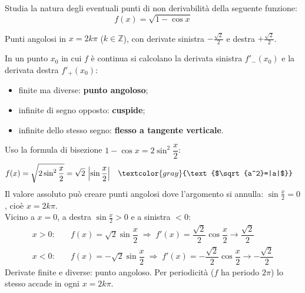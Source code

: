 
\begin{question}[ID=1.2, subtitle={Punti di non derivabilità di $f(x)=\sqrt{1-\cos x}$}, tags={non derivabilità, studio di funzione}, difficulty=media]
Studia la natura degli eventuali punti di non derivabilità della seguente funzione:
\begin{equation*}
    f(x) = \sqrt{1-\cos x}
\end{equation*}
\begin{solution}
Punti angolosi in $x=2k\pi$ ($k\in\mathbb{Z}$), con derivate sinistra $-\tfrac{\sqrt2}{2}$ e destra $+\tfrac{\sqrt2}{2}$.
\end{solution}
\begin{explanation}
In un punto $x_0$ in cui $f$ è continua si calcolano la derivata sinistra $f'_-(x_0)$ e la derivata destra $f'_+(x_0)$:
\begin{itemize}
    \item finite ma diverse: \textbf{punto angoloso};
    \item infinite di segno opposto: \textbf{cuspide};
    \item infinite dello stesso segno: \textbf{flesso a tangente verticale}.
\end{itemize}
Uso la formula di bisezione $1-\cos x=2\sin^2\dfrac x2$:
\[\begin{aligned}
f(x) &= \sqrt{2\sin^2\dfrac x2}=\sqrt2\,\left|\sin\dfrac x2\right| && \textcolor{gray}{\text{$\sqrt{a^2}=|a|$}}
\end{aligned}\]
Il valore assoluto può creare punti angolosi dove l'argomento si annulla: $\sin\tfrac x2=0$, cioè $x=2k\pi$. \\
Vicino a $x=0$, a destra $\sin\tfrac x2>0$ e a sinistra $<0$:
\[\begin{aligned}
x>0: &\quad f(x)=\sqrt2\sin\dfrac x2 \;\Rightarrow\; f'(x)=\dfrac{\sqrt2}{2}\cos\dfrac x2 \to \dfrac{\sqrt2}{2}\\
x<0: &\quad f(x)=-\sqrt2\sin\dfrac x2 \;\Rightarrow\; f'(x)=-\dfrac{\sqrt2}{2}\cos\dfrac x2 \to -\dfrac{\sqrt2}{2}
\end{aligned}\]
Derivate finite e diverse: punto angoloso. Per periodicità ($f$ ha periodo $2\pi$) lo stesso accade in ogni $x=2k\pi$.
\end{explanation}
\end{question}


